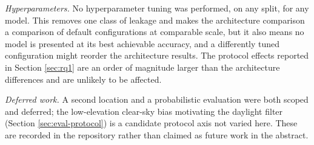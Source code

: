 \textit{Hyperparameters.} No hyperparameter tuning was performed, on any
split, for any model. This removes one class of leakage and makes the
architecture comparison a comparison of default configurations at
comparable scale, but it also means no model is presented at its best
achievable accuracy, and a differently tuned configuration might
reorder the architecture results. The protocol effects reported in
Section \ref{sec:rq1} are an order of magnitude larger than the
architecture differences and are unlikely to be affected.

\textit{Deferred work.} A second location and a probabilistic evaluation
were both scoped and deferred; the low-elevation clear-sky bias
motivating the daylight filter (Section \ref{sec:eval-protocol}) is a
candidate protocol axis not varied here. These are recorded in the
repository rather than claimed as future work in the abstract.
